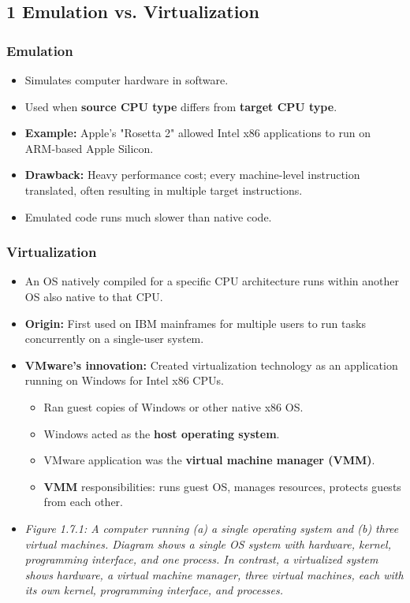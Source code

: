 \documentclass{article}
\begin{document}
\subsection*{1 Emulation vs. Virtualization}
\subsubsection*{Emulation}
\begin{itemize}
    \item Simulates computer hardware in software.
    \item Used when \textbf{source CPU type} differs from \textbf{target CPU type}.
    \item \textbf{Example:} Apple's "Rosetta 2" allowed Intel x86 applications to run on ARM-based Apple Silicon.
    \item \textbf{Drawback:} Heavy performance cost; every machine-level instruction translated, often resulting in multiple target instructions.
    \item Emulated code runs much slower than native code.
\end{itemize}

\subsubsection*{Virtualization}
\begin{itemize}
    \item An OS natively compiled for a specific CPU architecture runs within another OS also native to that CPU.
    \item \textbf{Origin:} First used on IBM mainframes for multiple users to run tasks concurrently on a single-user system.
    \item \textbf{VMware's innovation:} Created virtualization technology as an application running on Windows for Intel x86 CPUs.
    \begin{itemize}
        \item Ran guest copies of Windows or other native x86 OS.
        \item Windows acted as the \textbf{host operating system}.
        \item VMware application was the \textbf{virtual machine manager (VMM)}.
        \item \textbf{VMM} responsibilities: runs guest OS, manages resources, protects guests from each other.
    \end{itemize}
    \item \textit{Figure 1.7.1: A computer running (a) a single operating system and (b) three virtual machines. Diagram shows a single OS system with hardware, kernel, programming interface, and one process. In contrast, a virtualized system shows hardware, a virtual machine manager, three virtual machines, each with its own kernel, programming interface, and processes.}
\end{itemize}
\end{document}
